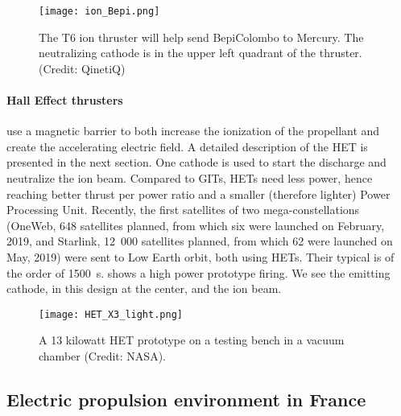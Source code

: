 \begin{figure}[!hbt]
  \centering
  \texttt{[image: ion\_Bepi.png]}
  \caption{The T6 ion thruster will help send BepiColombo to Mercury. The neutralizing cathode is in the upper left quadrant of the thruster. (Credit\string: QinetiQ)}
  \label{fig-iongridded}
\end{figure}
 
 \paragraph{Hall Effect thrusters} use a magnetic barrier to both increase the ionization of the propellant and create the accelerating electric field.
 A detailed description of the \ac{HET} is presented in the next section.
 One cathode is used to start the discharge and neutralize the ion beam.
 Compared to GITs, \ac{HET}s need less power, hence reaching better thrust per power ratio and a smaller (therefore lighter) Power Processing Unit.
 Recently, the first satellites of two mega-constellations (OneWeb, 648 satellites planned, from which six were launched on February,  2019, and Starlink, 12~000 satellites planned, from which 62 were launched on May,  2019) were sent to Low Earth orbit, both using \ac{HET}s. 
 Their typical \Isp is of the order of 1500~s.
  shows a high power prototype firing.
 We see the emitting cathode, in this design at the center, and the ion beam.
 \begin{figure}[!hbt]
   \centering
   \texttt{[image: HET\_X3\_light.png]}
   \caption{A 13 kilowatt \acs{HET} prototype on a testing bench in a vacuum chamber (Credit\string: NASA).  }
   \label{fig-13kWHET}
 \end{figure}
 
 
 \subsection{Electric propulsion environment in France} \label{subsec-HET_thruster}
 
